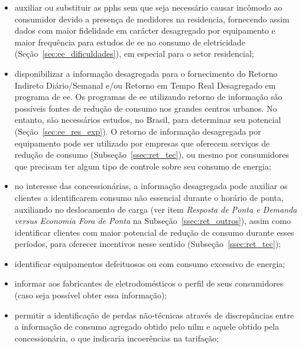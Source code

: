 \begin{itemize}
\item auxiliar ou substituir as \glspl{pph} sem que seja necessário
causar incômodo ao consumidor devido a presença de medidores na
residencia, fornecendo assim dados com maior fidelidade em carácter
desagregado por equipamento e maior frequência para estudos de \gls{ee}
no consumo de eletricidade (Seção~\ref{sec:ee_dificuldades}), em
especial para o setor residencial;
\item disponibilizar a informação desagregada para o fornecimento do
Retorno Indireto Diário/Semanal e/ou Retorno em Tempo Real Desagregado
em programa de \gls{ee}. Os programas de \gls{ee} utilizando retorno
de informação são possíveis fontes de redução de consumo nos grandes
centros urbanos. No entanto, são necessários estudos, no Brasil, para
determinar seu potencial (Seção~\ref{sec:ee_res_exp}). O retorno de
informação desagregada por equipamento pode ser utilizado por empresas
que oferecem serviços de redução de consumo
(Subseção~\ref{ssec:ret_tec}), ou mesmo por consumidores que precisam
ter algum tipo de controle sobre seu consumo de energia; \item no
interesse das concessionárias, a informação desagregada pode auxiliar
os clientes a identificarem consumo não essencial durante o horário de
ponta, auxiliando no deslocamento de carga (ver item \emph{Resposta de
Ponta e Demanda versus Economia Fora de Ponta} na
Subseção~\ref{ssec:ret_outros}), assim como identificar clientes com
maior potencial de redução de consumo durante esses períodos, para
oferecer incentivos nesse sentido (Subseção~\ref{ssec:ret_tec}); 
\item identificar equipamentos defeituosos ou com consumo excessivo de
energia;
\item informar aos fabricantes de eletrodomésticos o
perfil de seus consumidores (caso seja possível obter essa
informação);
\item permitir a identificação de perdas não-técnicas através de
discrepâncias entre a informação de consumo agregado obtido pelo
\acs{nilm} e aquele obtido pela concessionária, o que indicaria
incoerências na tarifação;
\end{itemize}

